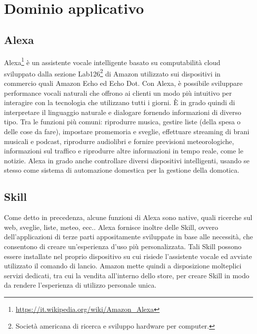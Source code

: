 \section{Dominio applicativo}
\subsection{Alexa}
Alexa\footnote{\href{Alexa. URL: https://it.wikipedia.org/wiki/Amazon\_Alexa}{https://it.wikipedia.org/wiki/Amazon\_Alexa}} è un assistente vocale intelligente basato su computabilità cloud sviluppato dalla sezione Lab126\footnote{Società americana di ricerca e sviluppo hardware per computer.} di Amazon utilizzato sui dispositivi in commercio quali Amazon Echo ed Echo Dot. Con Alexa, è possibile sviluppare performance vocali naturali che offrono ai clienti un modo più intuitivo per interagire con la tecnologia che utilizzano tutti i giorni. È in grado quindi di interpretare il linguaggio naturale e dialogare fornendo informazioni di diverso tipo. Tra le funzioni più comuni: riprodurre musica, gestire liste (della spesa o delle cose da fare), impostare promemoria e sveglie, effettuare streaming di brani musicali e podcast, riprodurre audiolibri e fornire previsioni meteorologiche, informazioni sul traffico e riprodurre altre informazioni in tempo reale, come le notizie. Alexa in grado anche controllare diversi dispositivi intelligenti, usando se stesso come sistema di automazione domestica per la gestione della domotica.

\subsection{Skill}
Come detto in precedenza, alcune funzioni di Alexa sono native, quali ricerche sul web, sveglie, liste, meteo, ecc.. Alexa fornisce inoltre delle Skill, ovvero dell'applicazioni di terze parti appositamente sviluppate in base alle necessità, che consentono di creare un’esperienza d'uso più personalizzata.
Tali Skill possono essere installate nel proprio dispositivo su cui risiede l'assistente vocale ed avviate utilizzato il comando di lancio.
Amazon mette quindi a disposizione molteplici servizi dedicati, tra cui la vendita all'interno dello store, per creare Skill in modo da rendere l'esperienza di utilizzo personale unica.


